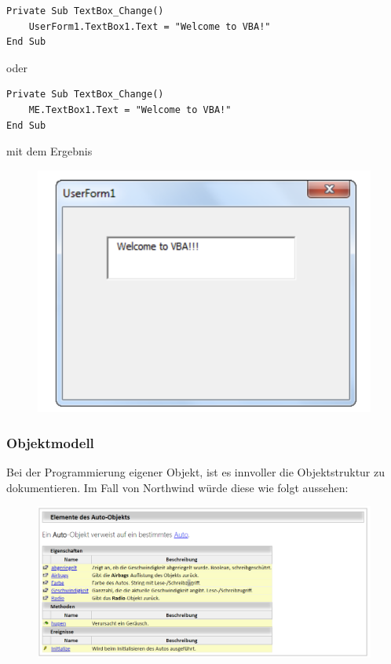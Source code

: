 \begin{lstlisting}[style=VBA]
Private Sub TextBox_Change()
	UserForm1.TextBox1.Text = "Welcome to VBA!"
End Sub
\end{lstlisting}
oder 
\begin{lstlisting}[style=VBA]
Private Sub TextBox_Change()
	ME.TextBox1.Text = "Welcome to VBA!"
End Sub
\end{lstlisting}
mit dem Ergebnis
\begin{figure}[H]
	\centering
	\includegraphics[scale = 0.3]{attachment/chapter_2/Scc057}
	\caption{}
	\label{fig:Scc057}
\end{figure}
\subsubsection{Objektmodell}
Bei der Programmierung eigener Objekt, ist es innvoller die Objektstruktur zu dokumentieren. Im Fall von Northwind würde diese wie folgt aussehen:
\begin{figure}[H]
	\centering
	\includegraphics[scale = 0.3]{attachment/chapter_2/Scc058}
	\caption{}
	\label{fig:Scc058}
\end{figure}

